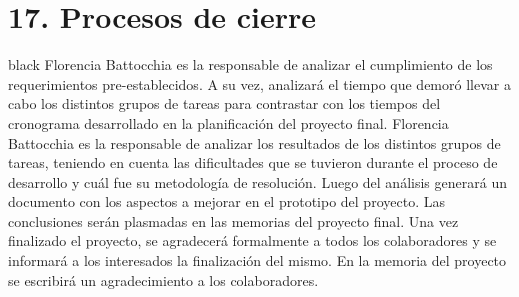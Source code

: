 \documentclass[11pt]{charter}
\begin{document}
\section{17. Procesos de cierre}    
\label{sec:cierre}

\begin{consigna}{black}
Florencia Battocchia es la responsable de analizar el cumplimiento de los
requerimientos pre-establecidos. A su vez, analizará el tiempo que demoró llevar a cabo los
distintos grupos de tareas para contrastar con los tiempos del cronograma desarrollado en
la planificación del proyecto final.\newline \newline  
Florencia Battocchia es la responsable de analizar los resultados de los distintos grupos
de tareas, teniendo en cuenta las dificultades que se tuvieron durante el proceso de
desarrollo y cuál fue su metodología de resolución. Luego del análisis generará un
documento con los aspectos a mejorar en el prototipo del proyecto. Las conclusiones serán
plasmadas en las memorias del proyecto final.\newline  \newline 
Una vez finalizado el proyecto, se agradecerá formalmente a todos los colaboradores
y se informará a los interesados la finalización del mismo. En la memoria del proyecto se
escribirá un agradecimiento a los colaboradores.

\end{consigna}
\end{document}
